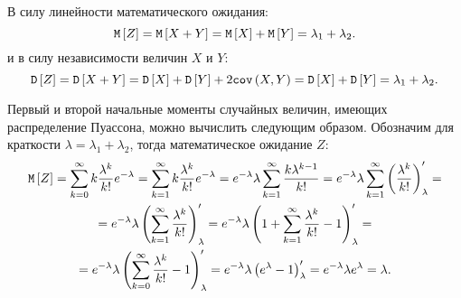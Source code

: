 В силу линейности математического ожидания:
\begin{equation}
    \mathtt{M} \left [ Z \right ]
    = \mathtt{M} \left [ X + Y \right ]
    = \mathtt{M} \left [ X \right ] + \mathtt{M} \left [ Y \right ]
    = \lambda_1 + \lambda_2 .
\end{equation}
и в силу независимости величин $X$ и $Y$:
\begin{equation}
    \mathtt{D} \left [ Z \right ]
    = \mathtt{D} \left [ X + Y \right ]
    = \mathtt{D} \left [ X \right ] + \mathtt{D} \left [ Y \right ] + 2 \texttt{cov} \left ( X , Y \right )
    = \mathtt{D} \left [ X \right ] + \mathtt{D} \left [ Y \right ]
    = \lambda_1 + \lambda_2 .
\end{equation}

Первый и второй начальные моменты случайных величин, имеющих распределение Пуассона, можно вычислить следующим образом. Обозначим для краткости $\lambda = \lambda_1 + \lambda_2$,
тогда математическое ожидание $Z$:
\begin{multline}
    \mathtt{M} \left [ Z \right ]
    = \sum_{k=0}^{\infty} k \frac{\lambda^k}{k!} e^{-\lambda}
    = \sum_{k=1}^{\infty} k \frac{\lambda^k}{k!} e^{-\lambda}
    = e^{-\lambda} \lambda \sum_{k=1}^{\infty} \frac{k \lambda^{k-1}}{k!}
    = e^{-\lambda} \lambda \sum_{k=1}^{\infty} \left ( \frac{\lambda^k}{k!} \right )_{\lambda}^{\prime} = \\
    = e^{-\lambda} \lambda \left ( \sum_{k=1}^{\infty} \frac{\lambda^k}{k!} \right )_{\lambda}^{\prime}
    = e^{-\lambda} \lambda \left ( 1 + \sum_{k=1}^{\infty} \frac{\lambda^k}{k!} - 1 \right )_{\lambda}^{\prime} = \\
    = e^{-\lambda} \lambda \left ( \sum_{k=0}^{\infty} \frac{\lambda^k}{k!} - 1 \right )_{\lambda}^{\prime}
    = e^{-\lambda} \lambda \left ( e^\lambda - 1 \right )_{\lambda}^{\prime}
    = e^{-\lambda} \lambda e^\lambda
    = \lambda .
\end{multline}

